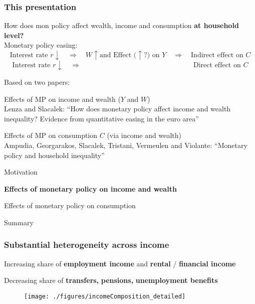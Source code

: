 \documentclass[pdflatex,aspectratio=169]{beamer}
\newcommand{\jemph}[1]{{\color{StataDarkBlue}#1}}
\newcommand{\jbemph}[1]{\textbf{\color{SlideNavy}#1}}
\begin{document}
\begin{frame}
\frametitle{\bf This presentation}

\jemph{How does mon policy affect wealth, income and consumption \textbf{at household level?}}\\[2mm]
\pause
Monetary policy easing:
$$
\text{Interest rate } r\downarrow \quad \Rightarrow \quad W\uparrow \text{and Effect (}\uparrow? \text{) on } Y \quad\Rightarrow\quad \text{Indirect effect on } C
$$
$$
\text{Interest rate } r\downarrow \quad \Rightarrow \phantom{\quad W\uparrow \text{and Effect (}\uparrow? \text{) on } Y \quad\Rightarrow\quad} \text{Direct effect on } C
$$
\pause

Based on two papers:
\bi\setlength{\itemsep}{4mm}
\item \jemph{Effects of MP on income and wealth ($Y$ and $W$)}\\
Lenza and Slacalek: ``How does monetary policy affect income and wealth inequality? Evidence from quantitative easing in the euro area''
\item \jemph{Effects of MP on consumption $C$ (via income and wealth)}\\
Ampudia, Georgarakos, Slacalek, Tristani, Vermeulen and Violante: ``Monetary policy and household inequality''
\ei

\end{frame}


\begin{frame}
\bi\setlength{\itemsep}{3mm}
\item Motivation
\item \jbemph{Effects of monetary policy on income and wealth}
\item Effects of monetary policy on consumption
\item Summary
\ei
\end{frame}

\begin{frame}\frametitle{\bf Substantial heterogeneity across income}
\bi
\item Increasing share of \textbf{\color{ao}employment income} and \textbf{\color{jgreen}rental} / \textbf{\color{red}financial income}
\item Decreasing share of \textbf{\color{amethyst} transfers,} \textbf{\color{amber} pensions,} \textbf{\color{applegreen} unemployment benefits}
\ei



\vspace*{-2.5mm}
\begin{figure}
\begin{center}
\texttt{[image: ./figures/incomeComposition\_detailed]}
\end{center}
\end{figure}

\end{frame}
\end{document}
